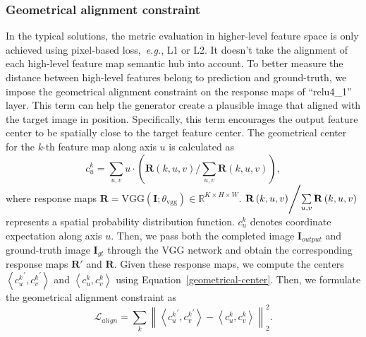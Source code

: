 \documentclass[journal]{IEEEtran}
\newcommand{\eg}{\emph{e.g.}}
\begin{document}
\subsubsection{Geometrical alignment constraint}
In the typical solutions, the metric evaluation in higher-level feature space is only achieved using pixel-based loss,~\eg, L1 or L2. It doesn't take the alignment of each high-level feature map semantic hub into account. To better measure the distance between high-level features belong to prediction and ground-truth, we impose the geometrical alignment constraint on the response maps of ``relu4\_1'' layer. This term can help the generator create a plausible image that aligned with the target image in position. Specifically, this term encourages the output feature center to be spatially close to the target feature center. The geometrical center for the \textit{k}-th feature map along axis $u$ is calculated as
\begin{equation}\label{geometrical-center}
c_u^k = \sum\limits_{u,v} {u \cdot \left( {\mathbf{R}\left( {k,u,v} \right)/\sum\limits_{u,v} {\mathbf{R}\left( {k,u,v} \right)} } \right)} ,
\end{equation}
where response maps $\mathbf{R} = \text{VGG}\left( {\mathbf{I};{\theta _\text{vgg}}} \right) \in {\mathbb{R}^{K \times H \times W}}$. ${{\mathbf{R}\left( {k,u,v} \right)} \mathord{\left/
		{\vphantom {{R\left( {k,u,v} \right)} {\sum\limits_{u,v} R }}} \right.
		\kern-\nulldelimiterspace} {\sum\limits_{u,v} \mathbf{R} }}\left( {k,u,v} \right)$ represents a spatial probability distribution function. $c_u^k$ denotes coordinate expectation along axis $u$. Then, we pass both the completed image ${\textbf{I}_{output}}$ and ground-truth image ${\mathbf{I}_{gt}}$ through the VGG network and obtain the corresponding response maps $\mathbf{R'}$ and $\mathbf{R}$. Given these response maps, we compute the centers $\left\langle {c{{_u^k}^\prime },c{{_v^k}^\prime }} \right\rangle $ and $\left\langle {c_u^k,c_v^k} \right\rangle $ using Equation~\ref{geometrical-center}. Then, we formulate the geometrical alignment constraint as
\begin{equation}\label{geometrical-alignment}
{\mathcal{L}_{align}} = \sum\limits_k {\left\| {\left\langle {c{{_u^k}^\prime },c{{_v^k}^\prime }} \right\rangle  - \left\langle {c_u^k,c_v^k} \right\rangle } \right\|_2^2} .
\end{equation}
\end{document}
